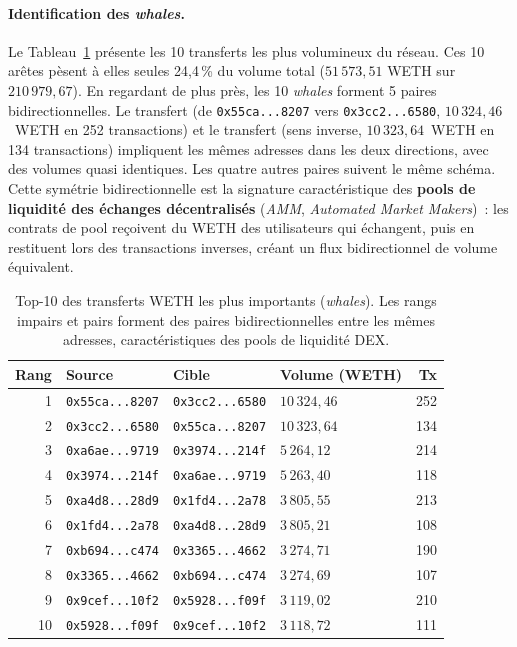 \paragraph{Identification des \textit{whales}.}
Le Tableau~\ref{tab:rq6_whales} pr\'esente les 10 transferts les plus volumineux du r\'eseau. Ces 10 ar\^etes p\`esent \`a elles seules 24{,}4\,\% du volume total ($51\,573{,}51$ WETH sur $210\,979{,}67$). En regardant de plus pr\`es, les 10 \textit{whales} forment 5 paires bidirectionnelles. Le transfert  (de \texttt{0x55ca...8207} vers \texttt{0x3cc2...6580}, $10\,324{,}46$~WETH en 252 transactions) et le transfert  (sens inverse, $10\,323{,}64$~WETH en 134 transactions) impliquent les m\^emes adresses dans les deux directions, avec des volumes quasi identiques. Les quatre autres paires suivent le m\^eme sch\'ema. Cette sym\'etrie bidirectionnelle est la signature caract\'eristique des \textbf{pools de liquidit\'e des \'echanges d\'ecentralis\'es} (\textit{AMM}, \textit{Automated Market Makers})~: les contrats de pool re\c{c}oivent du WETH des utilisateurs qui \'echangent, puis en restituent lors des transactions inverses, cr\'eant un flux bidirectionnel de volume \'equivalent.

\begin{table}[H]
\centering
\caption{Top-10 des transferts WETH les plus importants (\textit{whales}). Les rangs impairs et pairs forment des paires bidirectionnelles entre les m\^emes adresses, caract\'eristiques des pools de liquidit\'e DEX.}
\label{tab:rq6_whales}
\begin{tabular}{rlllr}
\toprule
Rang & Source & Cible & Volume (WETH) & Tx \\
\midrule
1 & \texttt{0x55ca...8207} & \texttt{0x3cc2...6580} & $10\,324{,}46$ & 252 \\
2 & \texttt{0x3cc2...6580} & \texttt{0x55ca...8207} & $10\,323{,}64$ & 134 \\
3 & \texttt{0xa6ae...9719} & \texttt{0x3974...214f} & $5\,264{,}12$ & 214 \\
4 & \texttt{0x3974...214f} & \texttt{0xa6ae...9719} & $5\,263{,}40$ & 118 \\
5 & \texttt{0xa4d8...28d9} & \texttt{0x1fd4...2a78} & $3\,805{,}55$ & 213 \\
6 & \texttt{0x1fd4...2a78} & \texttt{0xa4d8...28d9} & $3\,805{,}21$ & 108 \\
7 & \texttt{0xb694...c474} & \texttt{0x3365...4662} & $3\,274{,}71$ & 190 \\
8 & \texttt{0x3365...4662} & \texttt{0xb694...c474} & $3\,274{,}69$ & 107 \\
9 & \texttt{0x9cef...10f2} & \texttt{0x5928...f09f} & $3\,119{,}02$ & 210 \\
10 & \texttt{0x5928...f09f} & \texttt{0x9cef...10f2} & $3\,118{,}72$ & 111 \\
\bottomrule
\end{tabular}
\end{table}

